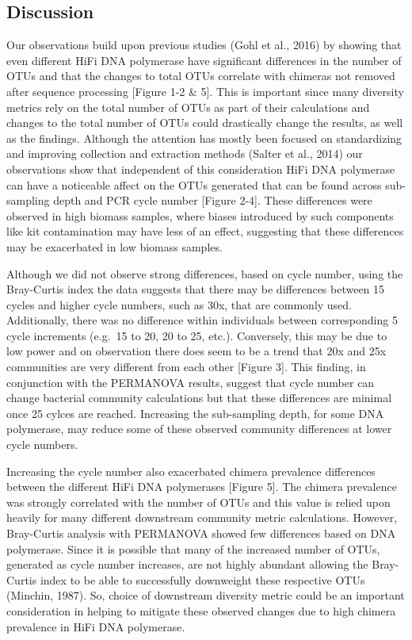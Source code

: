 \documentclass[12pt,]{article}
\begin{document}
\newpage

\subsection{Discussion}\label{discussion}

Our observations build upon previous studies (Gohl et al., 2016) by
showing that even different HiFi DNA polymerase have significant
differences in the number of OTUs and that the changes to total OTUs
correlate with chimeras not removed after sequence processing {[}Figure
1-2 \& 5{]}. This is important since many diversity metrics rely on the
total number of OTUs as part of their calculations and changes to the
total number of OTUs could drastically change the results, as well as
the findings. Although the attention has mostly been focused on
standardizing and improving collection and extraction methods (Salter et
al., 2014) our observations show that independent of this consideration
HiFi DNA polymerase can have a noticeable affect on the OTUs generated
that can be found across sub-sampling depth and PCR cycle number
{[}Figure 2-4{]}. These differences were observed in high biomass
samples, where biases introduced by such components like kit
contamination may have less of an effect, suggesting that these
differences may be exacerbated in low biomass samples.

Although we did not observe strong differences, based on cycle number,
using the Bray-Curtis index the data suggests that there may be
differences between 15 cycles and higher cycle numbers, such as 30x,
that are commonly used. Additionally, there was no difference within
individuals between corresponding 5 cycle increments (e.g.~15 to 20, 20
to 25, etc.). Conversely, this may be due to low power and on
observation there does seem to be a trend that 20x and 25x communities
are very different from each other {[}Figure 3{]}. This finding, in
conjunction with the PERMANOVA results, suggest that cycle number can
change bacterial community calculations but that these differences are
minimal once 25 cylces are reached. Increasing the sub-sampling depth,
for some DNA polymerase, may reduce some of these observed community
differences at lower cycle numbers.

Increasing the cycle number also exacerbated chimera prevalence
differences between the different HiFi DNA polymerases {[}Figure 5{]}.
The chimera prevalence was strongly correlated with the number of OTUs
and this value is relied upon heavily for many different downstream
community metric calculations. However, Bray-Curtis analysis with
PERMANOVA showed few differences based on DNA polymerase. Since it is
possible that many of the increased number of OTUs, generated as cycle
number increases, are not highly abundant allowing the Bray-Curtis index
to be able to successfully downweight these respective OTUs (Minchin,
1987). So, choice of downstream diversity metric could be an important
consideration in helping to mitigate these observed changes due to high
chimera prevalence in HiFi DNA polymerase.
\end{document}
